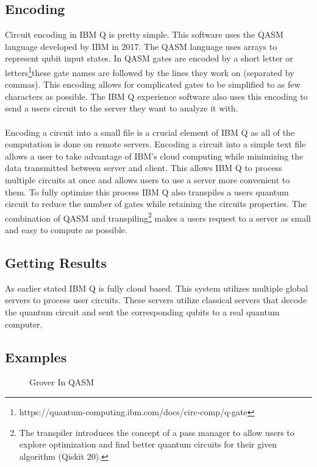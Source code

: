 \documentclass{article}
\newcommand{\url}{\footnote{https://quantum-computing.ibm.com/docs/circ-comp/q-gate}} %
\begin{document}
    \subsection{Encoding}
        Circuit encoding in IBM Q is pretty simple. This software uses the QASM language developed by IBM in 2017. The QASM language uses arrays to represent qubit input states. In QASM gates are encoded by a short letter or letters\url these gate names are followed by the lines they work on (separated by commas). This encoding allows for complicated gates to be simplified to as few characters as possible. The IBM Q experience software also uses this encoding to send a users circuit to the server they want to analyze it with.
        \\
         \smallskip
        \\
        Encoding a circuit into a small file is a crucial element of IBM Q as all of the computation is done on remote servers. Encoding a circuit into a simple text file allows a user to take advantage of IBM's cloud computing while minimizing the data transmitted between server and client. This allows IBM Q to process multiple circuits at once and allows users to use a server more convenient to them. To fully optimize this process IBM Q also transpiles a users quantum circuit to reduce the number of gates while retaining the circuits properties. The combination of QASM and transpiling\footnote{The transpiler introduces the concept of a pass manager to allow users to explore optimization and find better quantum circuits for their given algorithm (Qiskit 20).} makes a users request to a server as small and easy to compute as possible. 

    \subsection{Getting Results}
        As earlier stated IBM Q is fully cloud based. This system utilizes multiple global servers to process user circuits. These servers utilize classical servers that decode the quantum circuit and sent the corresponding qubits to a real quantum computer.
    \subsection{Examples}
        \begin{figure}
                
            \caption{Grover In QASM}
        \end{figure}
\end{document}

